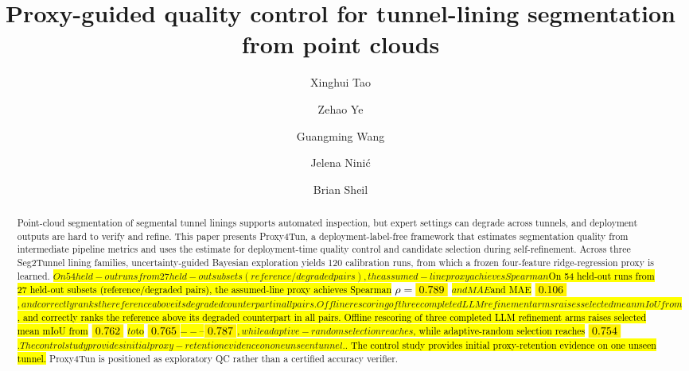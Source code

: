\documentclass[a4paper,fleqn]{cas-dc}
\let\texthl\hl
\renewcommand{\hl}[1]{\ifmmode\colorbox{yellow}{\ensuremath{#1}}\else\texthl{#1}\fi}
\begin{document}
\let\WriteBookmarks\relax
\def\floatpagepagefraction{1}
\def\textpagefraction{.001}





\title[mode=title]{\texorpdfstring{Proxy-guided quality control for tunnel-lining segmentation from point clouds}{Proxy-guided quality control for tunnel-lining segmentation from point clouds}}

\author[1]{Xinghui Tao}

\author[2]{Zehao Ye}


\author[1]{Guangming Wang}
\cormark[1]

\author[2]{Jelena Nini\'{c}}

\author[1]{Brian Sheil}






\begin{abstract}
Point-cloud segmentation of segmental tunnel linings supports automated inspection, but expert settings can degrade across tunnels, and deployment outputs are hard to verify and refine. This paper presents Proxy4Tun, a deployment-label-free framework that estimates segmentation quality from intermediate pipeline metrics and uses the estimate for deployment-time quality control and candidate selection during self-refinement. Across three Seg2Tunnel lining families, uncertainty-guided Bayesian exploration yields 120 calibration runs, from which a frozen four-feature ridge-regression proxy is learned. \hl{On 54 held-out runs from 27 held-out subsets (reference/degraded pairs), the assumed-line proxy achieves Spearman} $\rho=\hl{0.789}$ \hl{and MAE} $\hl{0.106}$\hl{, and correctly ranks the reference above its degraded counterpart in all pairs. Offline rescoring of three completed LLM refinement arms raises selected mean mIoU from} $\hl{0.762}$ \hl{to} $\hl{0.765}$\hl{--}$\hl{0.787}$\hl{, while adaptive-random selection reaches} $\hl{0.754}$\hl{. The control study provides initial proxy-retention evidence on one unseen tunnel.} Proxy4Tun is positioned as exploratory QC rather than a certified accuracy verifier.
\end{abstract}
\end{document}
